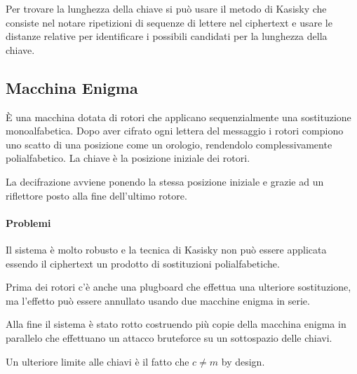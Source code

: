 Per trovare la lunghezza della chiave si pu\`o usare il metodo di Kasisky che consiste nel notare ripetizioni di sequenze di lettere nel ciphertext e usare le distanze relative per identificare i possibili candidati per la lunghezza della chiave.


\subsection{Macchina Enigma}

\`E una macchina dotata di rotori che applicano sequenzialmente una sostituzione monoalfabetica. Dopo aver cifrato ogni lettera del messaggio i rotori compiono uno scatto di una posizione come un orologio, rendendolo complessivamente polialfabetico. La chiave \`e la posizione iniziale dei rotori.

La decifrazione avviene ponendo la stessa posizione iniziale e grazie ad un riflettore posto alla fine dell'ultimo rotore.


\paragraph{Problemi}

Il sistema \`e molto robusto e la tecnica di Kasisky non pu\`o essere applicata essendo il ciphertext un prodotto di sostituzioni polialfabetiche.

Prima dei rotori c'\`e anche una plugboard che effettua una ulteriore sostituzione, ma l'effetto pu\`o essere annullato usando due macchine enigma in serie.

Alla fine il sistema \`e stato rotto costruendo pi\`u copie della macchina enigma in parallelo che effettuano un attacco bruteforce su un sottospazio delle chiavi.

Un ulteriore limite alle chiavi \`e il fatto che $c \ne m$ by design.
